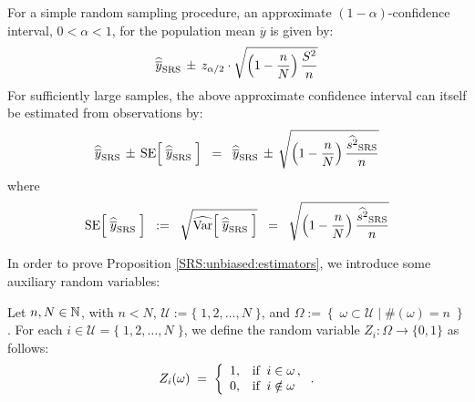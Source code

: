 \documentclass{article}
\begin{document}
\begin{corollary}\quad
For a simple random sampling procedure, an approximate $(1-\alpha)$-confidence interval, $0 < \alpha < 1$, for the population mean $\overline{y}$ is given by:
\begin{equation*}
\widehat{\overline{y}}_{\textnormal{SRS}} \, \pm \, z_{\alpha/2} \cdot \sqrt{\left(1-\dfrac{n}{N}\right)\dfrac{S^{2}}{n}}
\end{equation*}
For sufficiently large samples, the above approximate confidence interval can itself be estimated from observations by:
\begin{equation*}
\widehat{\overline{y}}_{\textnormal{SRS}} \, \pm \, \textnormal{SE}\!\left[\; \widehat{\overline{y}}_{\textnormal{SRS}} \;\right]
\;\; = \;\;
\widehat{\overline{y}}_{\textnormal{SRS}} \, \pm \, \sqrt{ \left(1-\dfrac{n}{N}\right)\dfrac{\widehat{s^{2}}_{\textnormal{SRS}}}{n} }
\end{equation*}
where
\begin{equation*}
\textnormal{SE}\!\left[\; \widehat{\overline{y}}_{\textnormal{SRS}} \;\right]
\;\; := \;\;
\sqrt{ \widehat{\textnormal{Var}}\!\left[\;\widehat{\overline{y}}_{\textnormal{SRS}}\;\right] }
\;\; = \;\;
\sqrt{ \left(1-\dfrac{n}{N}\right)\dfrac{\widehat{s^{2}}_{\textnormal{SRS}}}{n} }
\end{equation*}
\end{corollary}

\noindent
In order to prove Proposition \ref{SRS:unbiased:estimators}, we introduce some auxiliary random variables:

\begin{definition}\quad
Let $n, N \in \mathbb{N}$, with $n<N$, $\mathcal{U} := \{\;1,2,\ldots,N\;\}$, and $\Omega := \left\{\;\omega\subset\mathcal{U}\;\vert\;\#(\omega)=n\;\right\}$.  For each $i \in \mathcal{U} = \{\;1,2,\ldots,N\;\}$, we define the random variable $Z_{i} : \Omega \longrightarrow \{0,1\}$ as follows:
\begin{equation*}
    Z_{i}(\omega) \; = \;
    \left\{
    \begin{array}{cl}
        1, & \textnormal{if}\;\; i \in \omega\,, \\
        0, & \textnormal{if}\;\; i \notin \omega
    \end{array}
    \right..
\end{equation*}
\end{definition}
\end{document}
